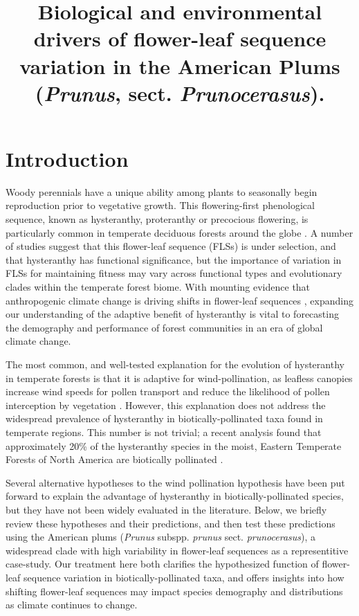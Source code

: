 \documentclass{article}[11pt]
\title{Biological and environmental drivers of flower-leaf sequence variation in the American Plums (\emph{Prunus}, sect. \emph{Prunocerasus}). }
\begin{document}

\maketitle


\section*{Introduction}
\noindent Woody perennials have a unique ability among plants to seasonally begin reproduction prior to vegetative growth. This flowering-first phenological sequence, known as hysteranthy, proteranthy or precocious flowering, is particularly common in temperate deciduous forests around the globe \citep{Rathcke_1985}. A number of studies suggest that this flower-leaf sequence (FLSs) is under selection, and that hysteranthy has functional significance, but the importance of variation in FLSs for maintaining fitness \citep{Gougherty2018,Buonaiuto2020,Guo2014} may vary across functional types and evolutionary clades within the temperate forest biome. With mounting evidence that anthropogenic climate change is driving shifts in flower-leaf sequences \citep{Ma2020:aa}, expanding our understanding of the adaptive benefit of hysteranthy is vital to forecasting the demography and performance of forest communities in an era of global climate change.

\noindent The most common, and well-tested explanation for the evolution of hysteranthy in temperate forests is that it is adaptive for wind-pollination, as leafless canopies increase wind speeds for pollen transport and reduce the likelihood of pollen interception by vegetation \citep{Whitehead1969,Niklas1985}. However, this explanation does not address the widespread prevalence of hysteranthy in biotically-pollinated taxa found in temperate regions. This number is not trivial; a recent analysis found that approximately 20\% of the hysteranthy species in the moist, Eastern Temperate Forests of North America are biotically pollinated \citep{Buonaiuto2020}. 

Several alternative hypotheses to the wind pollination hypothesis have been put forward to explain the advantage of hysteranthy in biotically-pollinated species, but they have not been widely evaluated in the literature. Below, we briefly review these hypotheses and their predictions, and then test these predictions using the American plums (\textit{Prunus} subspp. \textit{prunus} sect. \textit{prunocerasus}), a widespread clade with high variability in flower-leaf sequences as a representitive case-study. Our treatment here both clarifies the hypothesized function of flower-leaf sequence variation in biotically-pollinated taxa, and offers insights into how shifting flower-leaf sequences may impact species demography and distributions as climate continues to change.
\end{document}

